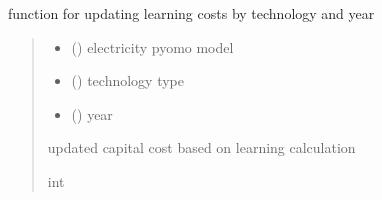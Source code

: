 \documentclass[letterpaper,10pt,english]{sphinxmanual}
\begin{document}
\begin{fulllineitems}
\label{\detokenize{src.models.electricity.scripts.runner:src.models.electricity.scripts.runner.cost_learning_func}}
\pysigstartsignatures
\pysiglinewithargsret
{}
{\sphinxparamcomma {}\sphinxparamcomma {}}
{}
\pysigstopsignatures
\sphinxAtStartPar
function for updating learning costs by technology and year
\begin{quote}\begin{description}
\begin{itemize}
\item {} 
\sphinxAtStartPar
{} ({\hyperref[\detokenize{src.models.electricity.scripts.electricity_model:src.models.electricity.scripts.electricity_model.PowerModel}]{}}) \textendash{} electricity pyomo model

\item {} 
\sphinxAtStartPar
{} () \textendash{} technology type

\item {} 
\sphinxAtStartPar
{} () \textendash{} year

\end{itemize}

\sphinxAtStartPar
updated capital cost based on learning calculation

\sphinxAtStartPar
int

\end{description}\end{quote}

\end{fulllineitems}

\end{document}
